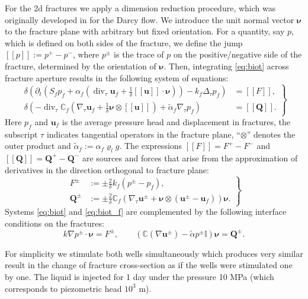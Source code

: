 \documentclass{article}
\newcommand{\CC}{\mathbb C}
\renewcommand{\div}{\operatorname{div}}
\newcommand{\eq}[1]{\begin{equation}#1\end{equation}}
\newcommand{\II}{\mathbb I}
\newcommand{\jmp}[1]{[\![#1]\!]}
\newcommand{\uu}{\vc u}
\newcommand{\vc}[1]{\boldsymbol{#1}}
\begin{document}
For the 2d fractures we apply a dimension reduction procedure, which was originally developed in \cite{martin-jaffre-roberts} for the Darcy flow.
We introduce the unit normal vector $\vc\nu$ to the fracture plane with arbitrary but fixed orientation.
For a quantity, say $p$, which is defined on both sides of the fracture, we define the jump $\jmp{p}:=p^+-p^-$, where $p^\pm$ is the trace of $p$ on the positive/negative side of the fracture, determined by the orientation of $\vc\nu$.
Then, integrating \eqref{eq:biot} across fracture aperture results in the following system of equations:
\eq{\label{eq:biot_f}\left.\begin{aligned}
\delta\left(\partial_t\left(S_fp_f + \alpha_f\left(\div_\tau\uu_f+\tfrac1\delta\jmp{\uu}\cdot\vc\nu\right)\right) - k_f\Delta_\tau p_f\right) &= \jmp{F}, \\
\delta\left(-\div_\tau\CC_f(\nabla_\tau\uu_f+\tfrac1\delta\vc\nu\otimes\jmp{\uu}) + \tilde\alpha_f\nabla_\tau p_f\right) &= \jmp{\vc Q}.
\end{aligned}\right\} }
Here $p_f$ and $\uu_f$ is the average pressure head and displacement in fractures, the subscript $\tau$ indicates tangential operators in the fracture plane, ``$\otimes$'' denotes the outer product and $\tilde\alpha_f:=\alpha_f\varrho_l g$.
The expressions $\jmp{F}=F^+-F^-$ and $\jmp{\vc Q}=\vc Q^+-\vc Q^-$ are sources and forces that arise from the approximation of derivatives in the direction orthogonal to fracture plane:
\eq{ \left.\begin{aligned}
F^\pm &:= \pm\frac2\delta k_f(p^\pm-p_f),\\
\vc Q^\pm &:= \pm\frac2\delta\CC_f(\nabla_\tau\uu^\pm + \vc\nu\otimes(\uu^\pm-\uu_f))\vc\nu. %
\end{aligned}\right\} }
Systems \eqref{eq:biot} and \eqref{eq:biot_f} are complemented by the following interface conditions on the fractures:
\eq{ k\nabla p^\pm\cdot\vc\nu = F^\pm,\qquad \left(\CC(\nabla\uu^\pm) - \tilde\alpha p^\pm\II\right)\vc\nu = \vc Q^\pm. }


For simplicity we stimulate both wells simultaneously which produces very similar result in the change of fracture cross-section as if the wells were stimulated one by one.
The liquid is injected for 1 day under the pressure 10 MPa (which corresponds to piezometric head $10^3$ m).
\end{document}
